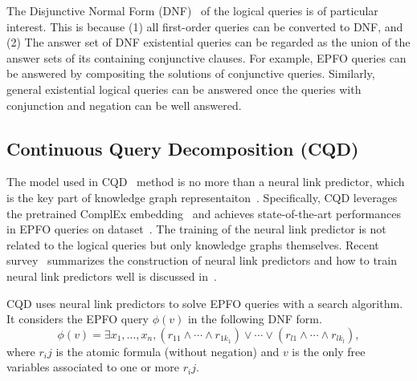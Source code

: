 \documentclass[11pt]{article}
\begin{document}
The Disjunctive Normal Form (DNF)~\cite{Marker2002Modeltheory} of the logical queries is of particular interest. This is because (1) all first-order queries can be converted to DNF, and (2) The answer set of DNF existential queries can be regarded as the union of the answer sets of its containing conjunctive clauses. For example, EPFO queries can be answered by compositing the solutions of conjunctive queries. Similarly, general existential logical queries can be answered once the queries with conjunction and negation can be well answered.

\subsection{Continuous Query Decomposition (CQD)}\label{sec:cqd}
The model used in CQD~\cite{Arakelyan2021ComplexQuery} method is no more than a neural link predictor, which is the key part of knowledge graph representaiton~\cite{Zhang2022KnowledgeGraph,Ji2022Surveyknowledge}.
Specifically, CQD leverages the pretrained ComplEx embedding~\cite{Trouillon2016ComplexEmbeddings} and achieves state-of-the-art performances in EPFO queries on dataset~\cite{Ren2020Query2boxReasoning}. The training of the neural link predictor is not related to the logical queries but only knowledge graphs themselves. Recent survey~\cite{Ji2022Surveyknowledge} summarizes the construction of neural link predictors and how to train neural link predictors well is discussed in~\cite{Ruffinelli2020YouCAN}.

CQD uses neural link predictors to solve EPFO queries with a search algorithm. It considers the EPFO query $\phi(v)$ in the following DNF form.
\begin{equation}\label{eq:epfo-cqd}
    \phi(v) = \exists x_1, ..., x_n, (r_{11}\land \cdots \land r_{1k_1}) \lor \cdots \lor (r_{l1}\land \cdots \land r_{lk_l}),
\end{equation}
where $r_ij$ is the atomic formula (without negation) and $v$ is the only free variables associated to one or more $r_ij$.
\end{document}
